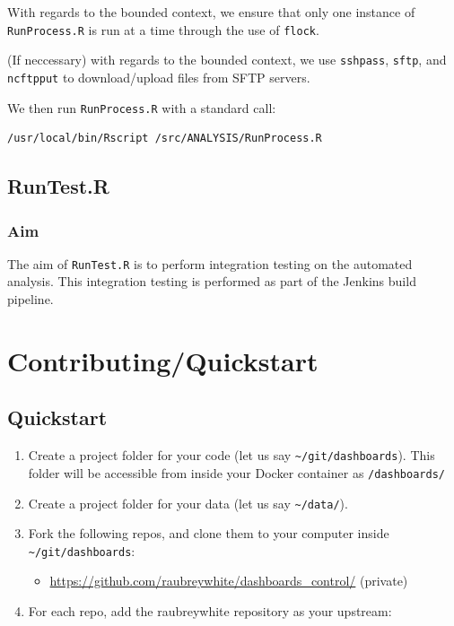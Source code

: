 \documentclass[12pt,]{article}
\providecommand{\tightlist}{%
  \setlength{\itemsep}{0pt}\setlength{\parskip}{0pt}}
\begin{document}
With regards to the bounded context, we ensure that only one instance of
\texttt{RunProcess.R} is run at a time through the use of
\texttt{flock}.

(If neccessary) with regards to the bounded context, we use
\texttt{sshpass}, \texttt{sftp}, and \texttt{ncftpput} to
download/upload files from SFTP servers.

We then run \texttt{RunProcess.R} with a standard call:

\begin{verbatim}
/usr/local/bin/Rscript /src/ANALYSIS/RunProcess.R
\end{verbatim}

\subsection{RunTest.R}\label{runtest.r}

\subsubsection{Aim}\label{aim-2}

The aim of \texttt{RunTest.R} is to perform integration testing on the
automated analysis. This integration testing is performed as part of the
Jenkins build pipeline.

\section{Contributing/Quickstart}\label{contributingquickstart}

\subsection{Quickstart}\label{quickstart}

\begin{enumerate}
\def\labelenumi{\arabic{enumi}.}
\tightlist
\item
  Create a project folder for your code (let us say
  \texttt{\textasciitilde{}/git/dashboards}). This folder will be
  accessible from inside your Docker container as \texttt{/dashboards/}
\item
  Create a project folder for your data (let us say
  \texttt{\textasciitilde{}/data/}).
\item
  Fork the following repos, and clone them to your computer inside
  \texttt{\textasciitilde{}/git/dashboards}:

  \begin{itemize}
  \tightlist
  \item
    \url{https://github.com/raubreywhite/dashboards_control/} (private)
  \end{itemize}
\item
  For each repo, add the raubreywhite repository as your upstream:
\end{enumerate}
\end{document}
